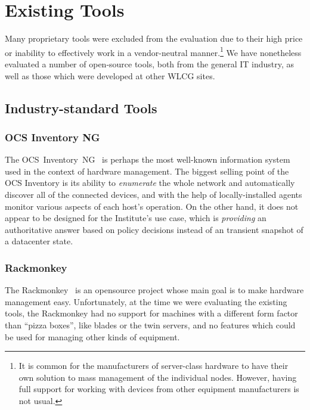\documentclass[deska]{subfiles}
\begin{document}
\appendix
\chapter{Existing Tools}
\label{sec:evaluating-existing-tools}

Many proprietary tools were excluded from the evaluation due to their high price or inability to effectively work in a
vendor-neutral manner.\footnote{It is common for the manufacturers of server-class hardware to have their own solution
to mass management of the individual nodes.  However, having full support for working with devices from other equipment
manufacturers is not usual.}  We have nonetheless evaluated a number of open-source tools, both from the general IT
industry, as well as those which were developed at other WLCG sites.

\section{Industry-standard Tools}

\subsection{OCS Inventory NG}

The OCS~Inventory~NG~\cite{ocs-inventory} is perhaps the most well-known information system used in the context of
hardware management.  The biggest selling point of the OCS Inventory is its ability to {\em enumerate} the whole network
and automatically discover all of the connected devices, and with the help of locally-installed agents monitor various
aspects of each host's operation.  On the other hand, it does not appear to be designed for the Institute's use case,
which is {\em providing} an authoritative answer based on policy decisions instead of an transient snapshot of a
datacenter state.

\subsection{Rackmonkey}

The Rackmonkey~\cite{rackmonkey} is an opensource project whose main goal is to make hardware management easy.
Unfortunately, at the time we were evaluating the existing tools, the Rackmonkey had no support for machines with a
different form factor than ``pizza boxes'', like blades or the twin servers, and no features which could be used for
managing other kinds of equipment.
\end{document}
